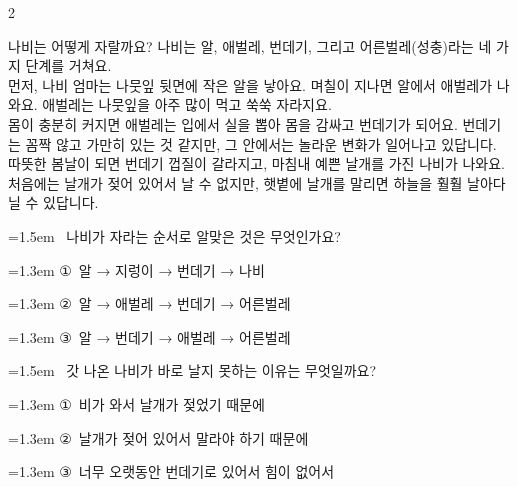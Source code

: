 \documentclass[12pt, a4paper]{article}
\begin{document}
\begin{multicols}{2}
\vspace{1mm}
\vspace{0.5mm}

\begin{passagebox}
\noindent{}나비는 어떻게 자랄까요? 나비는 알, 애벌레, 번데기, 그리고 어른벌레(성충)라는 네 가지 단계를 거쳐요. \\
먼저, 나비 엄마는 나뭇잎 뒷면에 작은 알을 낳아요. 며칠이 지나면 알에서 애벌레가 나와요. 애벌레는 나뭇잎을 아주 많이 먹고 쑥쑥 자라지요. \\
몸이 충분히 커지면 애벌레는 입에서 실을 뽑아 몸을 감싸고 번데기가 되어요. 번데기는 꼼짝 않고 가만히 있는 것 같지만, 그 안에서는 놀라운 변화가 일어나고 있답니다. \\
따뜻한 봄날이 되면 번데기 껍질이 갈라지고, 마침내 예쁜 날개를 가진 나비가 나와요. 처음에는 날개가 젖어 있어서 날 수 없지만, 햇볕에 날개를 말리면 하늘을 훨훨 날아다닐 수 있답니다.
\end{passagebox}
\vspace{1mm}

\noindent\begin{minipage}{\columnwidth}
\vspace{2mm}
{\hangindent=1.5em  ~나비가 자라는 순서로 알맞은 것은 무엇인가요?\par}

\vspace{0.5mm}
{\hangindent=1.3em  \noindent\hspace{0.3em}①~알 → 지렁이 → 번데기 → 나비\par}
{\hangindent=1.3em  \noindent\hspace{0.3em}②~알 → 애벌레 → 번데기 → 어른벌레\par}
{\hangindent=1.3em  \noindent\hspace{0.3em}③~알 → 번데기 → 애벌레 → 어른벌레\par}
\vspace{4mm}
\end{minipage}
\par

\noindent\begin{minipage}{\columnwidth}
\vspace{2mm}
{\hangindent=1.5em  ~갓 나온 나비가 바로 날지 못하는 이유는 무엇일까요?\par}

\vspace{0.5mm}
{\hangindent=1.3em  \noindent\hspace{0.3em}①~비가 와서 날개가 젖었기 때문에\par}
{\hangindent=1.3em  \noindent\hspace{0.3em}②~날개가 젖어 있어서 말라야 하기 때문에\par}
{\hangindent=1.3em  \noindent\hspace{0.3em}③~너무 오랫동안 번데기로 있어서 힘이 없어서\par}
\vspace{4mm}
\end{minipage}
\par


\end{multicols}
\end{document}
